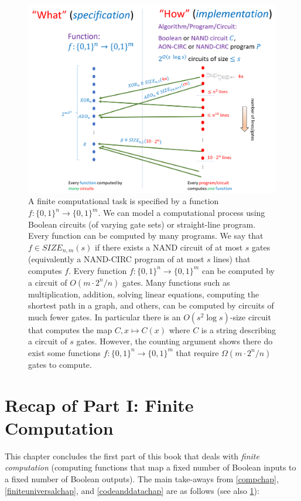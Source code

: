 \begin{figure}
\centering
\includegraphics[width=\textwidth, height=0.25\paperheight, keepaspectratio]{../figure/finitecomprecap.png}
\caption{A finite computational task is specified by a function
\(f:\{0,1\}^n \rightarrow \{0,1\}^m\). We can model a computational
process using Boolean circuits (of varying gate sets) or straight-line
program. Every function can be computed by many programs. We say that
\(f \in \ensuremath{\mathit{SIZE}}_{n,m}(s)\) if there exists a NAND
circuit of at most \(s\) gates (equivalently a NAND-CIRC program of at
most \(s\) lines) that computes \(f\). Every function
\(f:\{0,1\}^n \rightarrow \{0,1\}^m\) can be computed by a circuit of
\(O(m \cdot 2^n/n)\) gates. Many functions such as multiplication,
addition, solving linear equations, computing the shortest path in a
graph, and others, can be computed by circuits of much fewer gates. In
particular there is an \(O(s^2 \log s)\)-size circuit that computes the
map \(C,x \mapsto C(x)\) where \(C\) is a string describing a circuit of
\(s\) gates. However, the counting argument shows there do exist some
functions \(f:\{0,1\}^n \rightarrow \{0,1\}^m\) that require
\(\Omega(m \cdot 2^n /n)\) gates to compute.}
\label{finiterecapfig}
\end{figure}

\section{Recap of Part I: Finite
Computation}\label{Recap-of-Part-I-Finite-Co}

This chapter concludes the first part of this book that deals with
\emph{finite computation} (computing functions that map a fixed number
of Boolean inputs to a fixed number of Boolean outputs). The main
take-aways from \cref{compchap}, \cref{finiteuniversalchap}, and
\cref{codeanddatachap} are as follows (see also \cref{finiterecapfig}):

